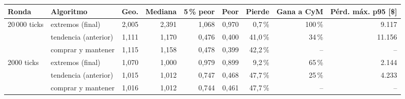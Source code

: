 \begin{tabular}{llrrrrrrr}
\toprule
Ronda & Algoritmo & Geo. & Mediana & 5\,\% peor & Peor & Pierde & Gana a CyM & Pérd. máx. p95 [\$] \\
\midrule
20\,000 ticks & extremos (final) & 2,005 & 2,391 & 1,068 & 0,970 & 0,7\,\% & 100\,\% & 9.117 \\
 & tendencia (anterior) & 1,111 & 1,170 & 0,476 & 0,400 & 41,0\,\% & 34\,\% & 11.156 \\
 & comprar y mantener & 1,115 & 1,158 & 0,478 & 0,399 & 42,2\,\% & -- & -- \\
\midrule
2000 ticks & extremos (final) & 1,070 & 1,000 & 0,979 & 0,899 & 9,2\,\% & 65\,\% & 2.144 \\
 & tendencia (anterior) & 1,015 & 1,012 & 0,747 & 0,468 & 47,7\,\% & 25\,\% & 4.233 \\
 & comprar y mantener & 1,016 & 1,012 & 0,744 & 0,461 & 47,7\,\% & -- & -- \\
\bottomrule
\end{tabular}
